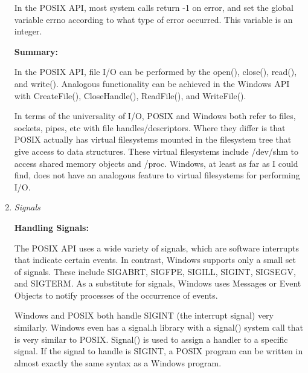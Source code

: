 \documentclass[letterpaper,10pt,titlepage]{article}
\newcommand{\tab}{\hspace*{2em}} %
\begin{document}
\begin{enumerate}
\tab In the POSIX API, most system calls return -1 on error, and set the global variable errno according to what type of error occurred. This variable is an integer. \newline %

\textbf{Summary:}\newline

In the POSIX API, file I/O can be performed by the open(), close(), read(), and write(). Analogous functionality can be achieved in the Windows API with CreateFile(), CloseHandle(), ReadFile(), and WriteFile(). \newline

In terms of the universality of I/O, POSIX and Windows both refer to files, sockets, pipes, etc with file handles/descriptors. Where they differ is that POSIX actually has virtual filesystems mounted in the filesystem tree that give access to data structures. These virtual filesystems include /dev/shm to access shared memory objects and /proc. Windows, at least as far as I could find, does not have an analogous feature to virtual filesystems for performing I/O. \newline


\item \emph{Signals} \newline

\textbf{Handling Signals:}\newline

\tab The POSIX API uses a wide variety of signals, which are software interrupts that indicate certain events. In contrast, Windows supports only a small set of signals. These include SIGABRT, SIGFPE, SIGILL, SIGINT, SIGSEGV, and SIGTERM. As a substitute for signals, Windows uses Messages or Event Objects to notify processes of the occurrence of events.\newline

\tab Windows and POSIX both handle SIGINT (the interrupt signal) very similarly. Windows even has a signal.h library with a signal() system call that is very similar to POSIX. Signal() is used to assign a handler to a specific signal. If the signal to handle is SIGINT, a POSIX program can be written in almost exactly the same syntax as a Windows program.\newline


\end{enumerate}
\end{document}
